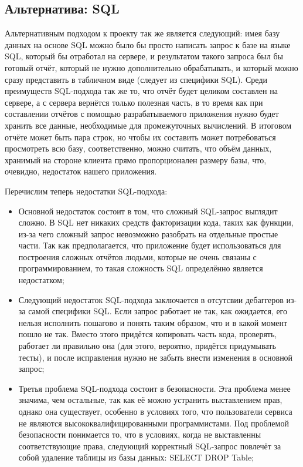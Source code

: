 \documentclass[12pt]{article}
\begin{document}
    \subsection{Альтернатива: SQL}
    Альтернативным подходом к проекту так же является следующий: имея базу данных на основе SQL можно было бы просто написать запрос к базе
    на языке SQL, который бы отработал на сервере, и результатом такого запроса был бы готовый отчёт, который не нужно дополнительно
    обрабатывать, и который можно сразу представить в табличном виде (следует из специфики SQL). Среди преимуществ SQL-подхода так же то,
    что отчёт будет целиком составлен на сервере, а с сервера вернётся только полезная часть, в то время как при составлении отчётов с
    помощью разрабатываемого приложения нужно будет хранить все данные, необходимые для промежуточных вычислений. В итоговом отчёте
    может быть пара строк, но чтобы их составить может потребоваться просмотреть всю базу, соответственно, можно считать, что
    объём данных, хранимый на стороне клиента прямо пропорционален размеру базы, что, очевидно, недостаток нашего приложения.

    Перечислим теперь недостатки SQL-подхода:
    \begin{itemize}
        \item Основной недостаток состоит в том, что сложный SQL-запрос выглядит сложно. В SQL нет никаких средств факторизации кода, таких
        как функции, из-за чего сложный запрос невозможно разобрать на отдельные простые части. Так как предполагается, что приложение будет
        использоваться для построения сложных отчётов людьми, которые не очень связаны с программированием, то такая сложность SQL
        определённо является недостатком;
        \item Следующий недостаток SQL-подхода заключается в отсутсвии дебаггеров из-за самой специфики SQL. Если запрос работает не так,
        как ожидается, его нельзя исполнить пошагово и понять таким образом, что и в какой момент пошло не так. Вместо этого придётся копировать
        часть кода, проверять, работает ли правильно она (для этого, вероятно, придётся придумывать тесты), и после исправления нужно не забыть
        внести изменения в основной запрос;
        \item Третья проблема SQL-подхода состоит в безопасности. Эта проблема менее значима, чем остальные, так как её можно устранить выставлением
        прав, однако она существует, особенно в условиях того, что пользователи сервиса не являются высококвалифицированными программистами.
        Под проблемой безопасности понимается то, что в условиях, когда не выставленны соответствующие права, следующий корректный
        SQL-запрос повлечёт за собой удаление таблицы из базы данных: SELECT DROP Table;
    \end{itemize}
\end{document}
